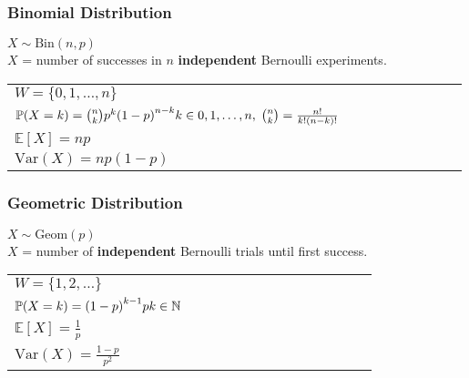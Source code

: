 \subsubsection{Binomial Distribution}
$X \sim \mathrm{Bin}(n,p)$\\
$X$ = number of successes in $n$ \textbf{independent} Bernoulli experiments.

\renewcommand{\arraystretch}{1.3}
\setlength{\oldtabcolsep}{\tabcolsep}\setlength\tabcolsep{0pt}

\begin{tabularx}{\linewidth}{@{}p{0.5\linewidth}p{0.49\linewidth}@{}}
    $W=\{0,1,\ldots,n\}$                                                                                             &
    \multirow{4}{*}{
        \begin{minipage}{\linewidth}
            
        \end{minipage}
    }                                                                                                                  \\
    $\mathbb{P}(X=k)={n\choose k}p^k{(1-p)}^{n-k}\newline k\in {0,1,\ldots, n},\; {n\choose k}=\frac{n!}{k!(n-k)!} $ & \\
    $\mathbb{E}[X] = np$                                                                                             & \\
    $\mathrm{Var}(X) = np(1-p)$                                                                                      &
\end{tabularx}

\renewcommand{\arraystretch}{1}
\setlength\tabcolsep{\oldtabcolsep}

\subsubsection{Geometric Distribution}
$X \sim \mathrm{Geom}(p)$\\
$X$ = number of \textbf{independent} Bernoulli trials until first success.

\renewcommand{\arraystretch}{1.3}
\setlength{\oldtabcolsep}{\tabcolsep}\setlength\tabcolsep{3pt}

\begin{tabularx}{\linewidth}{@{}p{0.5\linewidth}p{0.49\linewidth}@{}}
    $W=\{1,2,\ldots\}$                                      &
    \multirow{4}{*}{
        
    }                                                         \\
    $\mathbb{P}(X=k)={(1-p)}^{k-1}p\newline k\in\mathbb{N}$ & \\
    $\mathbb{E}[X] = \frac{1}{p}$                           & \\
    $\mathrm{Var}(X) = \frac{1-p}{p^2}$
\end{tabularx}

